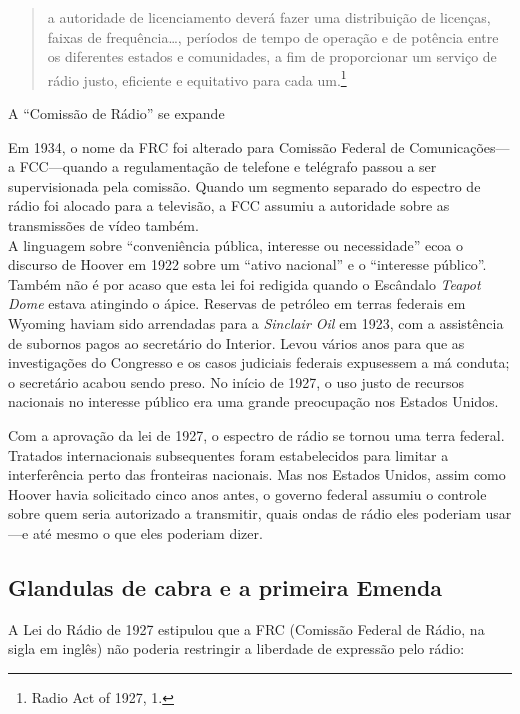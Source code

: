 \documentclass{book}
\newcommand{\ingles}[1]{\textit{#1}}
\begin{document}
\begin{quote}
    a autoridade de licenciamento deverá fazer uma distribuição de licenças,
    faixas de frequência\ldots, períodos de tempo de operação e de potência entre
    os diferentes estados e comunidades, a fim de proporcionar um serviço de rádio
    justo, eficiente e equitativo para cada um.\footnote{Radio Act of 1927, 1.}\\
\end{quote}


A ``Comissão de Rádio'' se expande

Em 1934, o nome da FRC foi alterado para Comissão Federal de Comunicações---a 
FCC---quando a regulamentação de telefone e telégrafo passou a ser supervisionada
pela comissão. Quando um segmento separado do espectro de rádio foi alocado para
a televisão, a FCC assumiu a autoridade sobre as transmissões de vídeo também.\\

A linguagem sobre ``conveniência pública, interesse ou necessidade'' ecoa o discurso
de Hoover em 1922 sobre um ``ativo nacional'' e o ``interesse público''. Também
não é por acaso que esta lei foi redigida quando o Escândalo \ingles{Teapot Dome}
estava atingindo o ápice. Reservas de petróleo em terras federais em Wyoming haviam
sido arrendadas para a \ingles{Sinclair Oil} em 1923, com a assistência de subornos
pagos ao secretário do Interior. Levou vários anos para que as investigações do
Congresso e os casos judiciais federais expusessem a má conduta; o secretário
acabou sendo preso. No início de 1927, o uso justo de recursos nacionais no
interesse público era uma grande preocupação nos Estados Unidos.

Com a aprovação da lei de 1927, o espectro de rádio se tornou uma terra federal.
Tratados internacionais subsequentes foram estabelecidos para limitar a
interferência perto das fronteiras nacionais. Mas nos Estados Unidos, assim como
Hoover havia solicitado cinco anos antes, o governo federal assumiu o controle
sobre quem seria autorizado a transmitir, quais ondas de rádio eles poderiam
usar---e até mesmo o que eles poderiam dizer.

\subsection{Glandulas de cabra e a primeira Emenda}
\label{cap8:os-como-glandulas}
A Lei do Rádio de 1927 estipulou que a FRC (Comissão Federal de Rádio, na sigla
em inglês) não poderia restringir a liberdade de expressão pelo rádio:
\end{document}
